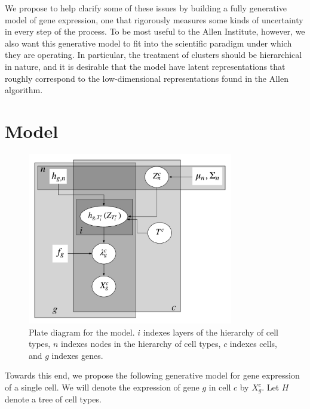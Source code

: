 We propose to help clarify some of these issues by building a fully generative model of gene expression, one that rigorously measures some kinds of uncertainty in every step of the process.  To be most useful to the Allen Institute, however, we also want this generative model to fit into the scientific paradigm under which they are operating.  In particular, the treatment of clusters should be hierarchical in nature, and it is desirable that the model have latent representations that roughly correspond to the low-dimensional representations found in the Allen algorithm.  

\section{Model}

\begin{figure}
\includegraphics[width=0.8\textwidth]{pics/plate}
\caption{Plate diagram for the model\label{fig:plate}.  $i$ indexes layers of the hierarchy of cell types, $n$ indexes nodes in the hierarchy of cell types,  $c$ indexes cells, and $g$ indexes genes.}
\end{figure}

Towards this end, we propose the following generative model for gene expression of a single cell.  We will denote the expression of gene $g$ in cell $c$ by $X_g^c$.  Let $H$ denote a tree of cell types.   

